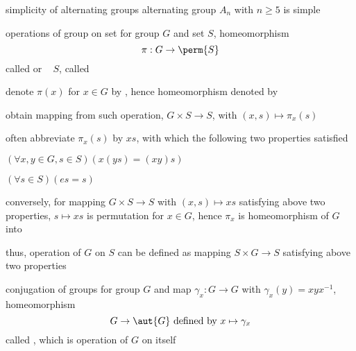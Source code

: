 \documentclass[17pt,landscape]{foils}
\begin{document}
{\begin{mytheorem}{simplicity of alternating groups}
	alternating group $A_n$ with $n\geq 5$ is simple
\end{mytheorem}



\begin{mydefinition}{operations of group on set}%
	for group $G$ and set $S$,
	homeomorphism
	$$
		\pi:G \to \perm{S}
	$$
	called  or %
	\shrinkspacewithintheoremslike\
	\ibit
	\iitem
		$S$, called %

	\iitem
		denote $\pi(x)$ for $x\in G$
		by \define{$\pi_x$},
		hence homeomorphism denoted by 
	\eit
\end{mydefinition}

\bit
\item
	obtain mapping from such operation, $G\times S \to S$, with $(x,s)\mapsto \pi_x(s)$

\item
	often abbreviate $\pi_x(s)$ by $xs$, with which the following two properties satisfied
	\bit
	\item
		$ \left( \forall x,y\in G, s\in S \right) \left( x(ys) = (xy)s \right) $
	\item
		$ \left( \forall s\in S \right) \left( es = s \right) $
	\eit

\item
	conversely, for mapping $G\times S\to S$ with $(x,s)\mapsto xs$ satisfying above two properties,
	$s\mapsto xs$ is permutation for $x\in G$,
	hence $\pi_x$ is homeomorphism of $G$ into \

\item
	thus, operation of $G$ on $S$ can be defined as mapping $S\times G\to S$ satisfying above two properties\
\eit



\begin{mydefinition}{conjugation of groups}%
		\index{group!conjugation}
	for group $G$ and map $\gamma_x:G\to G$ with $\gamma_x(y) = xyx^{-1}$,
	homeomorphism
	$$
		G \to \aut{G} \mbox{ defined by } x\mapsto \gamma_x
	$$
	called ,
	which is operation of $G$ on itself\
\end{mydefinition}

}
\end{document}
